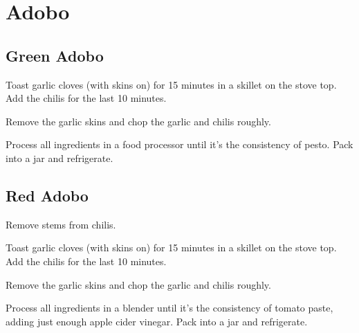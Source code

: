 \section{Adobo}
\begin{recipe}


\subsection{Green Adobo}


Toast garlic cloves (with skins on) for 15 minutes in a skillet on the stove top. Add the chilis for the last 10 minutes.

Remove the garlic skins and chop the garlic and chilis roughly.

Process all ingredients in a food processor until it's the consistency of pesto. Pack into a jar and refrigerate.

\subsection{Red Adobo}


Remove stems from chilis.

Toast garlic cloves (with skins on) for 15 minutes in a skillet on the stove top. Add the chilis for the last 10 minutes.

Remove the garlic skins and chop the garlic and chilis roughly.

Process all ingredients in a blender until it's the consistency of tomato paste, adding just enough apple cider vinegar. Pack into a jar and refrigerate.

\end{recipe}
